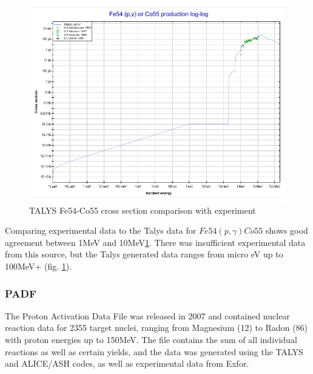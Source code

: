 \begin{figure}[tbp]
  \begin{center}
    \includegraphics[width=.6\linewidth]{chapters/isotope_activation_and_radioactive_decay/images/Fe54-Co55.png}
    \caption{TALYS Fe54-Co55 cross section comparison with experiment \cite{tendlfeco}}
    \label{fig:Fe54-Co55}
  \end{center}
\end{figure}

Comparing experimental data to the Talys data for $Fe54(p, \gamma)Co55$ shows good agreement between 1MeV and 10MeV\ref{fig:Fe54-Co55}.  There was insufficient experimental data from this source, but the Talys generated data ranges from micro eV up to 100MeV+ (fig. \ref{fig:Fe54-Co55}).


\FloatBarrier
\subsubsection{PADF}

The Proton Activation Data File was released in 2007 and contained nuclear reaction data for 2355 target nuclei, ranging from Magnesium (12) to Radon (86) with proton energies up to 150MeV.  The file contains the sum of all individual reactions as well as certain yields, and the data was generated using the TALYS and ALICE/ASH codes, as well as experimental data from Exfor\cite{exforlink}.


